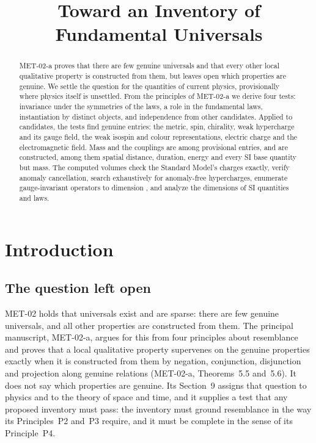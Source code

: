 \documentclass{situationist-preprint}
\title{Toward an Inventory of Fundamental Universals}
\begin{document}
\maketitle

\begin{abstract}
MET-02-a proves that there are few genuine universals and that every other local qualitative property is constructed from them, but leaves open which properties are genuine. We settle the question for the quantities of current physics, provisionally where physics itself is unsettled. From the principles of MET-02-a we derive four tests: invariance under the symmetries of the laws, a role in the fundamental laws, instantiation by distinct objects, and independence from other candidates. Applied to \vvNK{} candidates, the tests find \vvNKgenuine{} genuine entries: the metric, spin, chirality, weak hypercharge and its gauge field, the weak isospin and colour representations, electric charge and the electromagnetic field. Mass and the couplings are among \vvNKprovisional{} provisional entries, and \vvNKconstructed{} are constructed, among them spatial distance, duration, energy and every SI base quantity but mass. The computed volumes check the Standard Model's charges exactly, verify anomaly cancellation, search exhaustively for anomaly-free hypercharges, enumerate gauge-invariant operators to dimension \vvDmaxC{}, and analyze the dimensions of \vvNF{} SI quantities and \vvNG{} laws.
\end{abstract}

\section{Introduction}\label{s:intro}

\subsection{The question left open}

MET-02 holds that universals exist and are sparse: there are few genuine universals, and all other properties are constructed from them. The principal manuscript, MET-02-a, argues for this from four principles about resemblance and proves that a local qualitative property supervenes on the genuine properties exactly when it is constructed from them by negation, conjunction, disjunction and projection along genuine relations (MET-02-a, Theorems~5.5 and~5.6). It does not say which properties are genuine. Its Section~9 assigns that question to physics and to the theory of space and time, and it supplies a test that any proposed inventory must pass: the inventory must ground resemblance in the way its Principles~P2 and~P3 require, and it must be complete in the sense of its Principle~P4.
\end{document}
